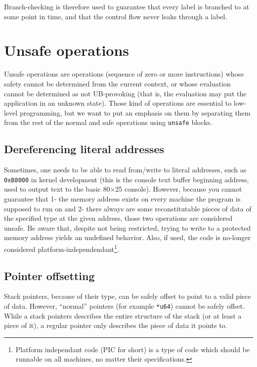 Branch-checking is therefore used to guarantee that every label is branched to at some point in time, and that the control flow never leaks through a label.

\section{Unsafe operations}\label{sec:nstar-common-unsafe}

Unsafe operations are operations (sequence of zero or more instructions) whose safety cannot be determined from the current context, or whose evaluation cannot be determined as not UB-provoking (that is, the evaluation may put the application in an unknown state).
Those kind of operations are essential to low-level programming, but we want to put an emphasis on them by separating them from the rest of the normal and safe operations using \texttt{unsafe} blocks.

\subsection{Dereferencing literal addresses}\label{subsec:nstar-common-unsafe-derefliteraladdr}

Sometimes, one needs to be able to read from/write to literal addresses, such as \texttt{0xB8000} in kernel development (this is the console text buffer beginning address, used to output text to the basic 80×25 console).
However, because you cannot guarantee that 1- the memory address exists on every machine the program is supposed to run on and 2- there always are some reconstitutable pieces of data of the specified type at the given address, those two operations are considered unsafe.
Be aware that, despite not being restricted, trying to write to a protected memory address yields an undefined behavior.
Also, if used, the code is no-longer considered platform-independendant\footnote{Platform independant code (PIC for short) is a type of code which should be runnable on all machines, no matter their specifications.}.

\subsection{Pointer offsetting}\label{subsec:nstar-common-unsafe-ptroffset}

Stack pointers, because of their type, can be safely offset to point to a valid piece of data.
However, ``normal'' pointers (for example \texttt{*u64}) cannot be safely offset.
While a stack pointers describes the entire structure of the stack (or at least a piece of it), a regular pointer only describes the piece of data it points to.

